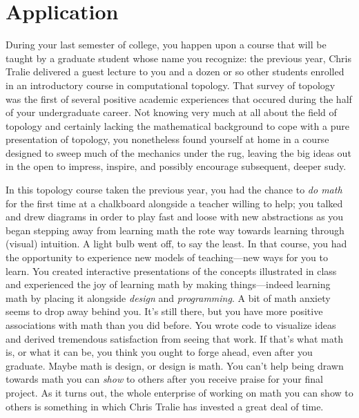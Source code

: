 \documentclass[../main.tex]{subfiles}
\begin{document}
\section{Application}
 
During your last semester of college, you happen upon a course that will be taught by a graduate student whose name you recognize: the previous year, Chris Tralie delivered a guest lecture to you and a dozen or so other students enrolled in an introductory course in computational topology. That survey of topology was the first of several positive academic experiences that occured during the half of your undergraduate career. Not knowing very much at all about the field of topology and certainly lacking the mathematical background to cope with a pure presentation of topology, you nonetheless found yourself at home in a course designed to sweep much of the mechanics under the rug, leaving the big ideas out in the open to impress, inspire, and possibly encourage subsequent, deeper sudy.

In this topology course taken the previous year, you had the chance to \textit{do math} for the first time at a chalkboard alongside a teacher willing to help; you talked and drew diagrams in order to play fast and loose with new abstractions as you began stepping away from learning math the rote way towards learning through (visual) intuition. A light bulb went off, to say the least. In that course, you had the opportunity to experience new models of teaching---new ways for you to learn. You created interactive presentations of the concepts illustrated in class and experienced the joy of learning math by making things---indeed learning math by placing it alongside \textit{design} and \textit{programming}. A bit of math anxiety seems to drop away behind you. It's still there, but you have more positive associations with math than you did before. You wrote code to visualize ideas and derived tremendous satisfaction from seeing that work. If that's what math is, or what it can be, you think you ought to forge ahead, even after you graduate. Maybe math is design, or design is math. You can't help being drawn towards math you can \textit{show} to others after you receive praise for your final project. As it turns out, the whole enterprise of working on math you can show to others is something in which Chris Tralie has invested a great deal of time.
\end{document}
